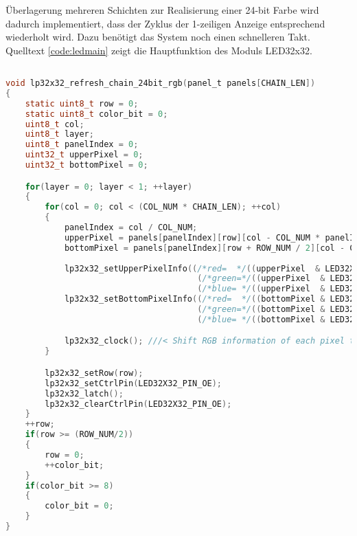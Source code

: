Überlagerung mehreren Schichten zur Realisierung einer 24-bit Farbe wird dadurch implementiert, dass der Zyklus der 1-zeiligen Anzeige entsprechend wiederholt wird. Dazu benötigt das System noch einen schnelleren Takt. Quelltext \ref{code:ledmain} zeigt die Hauptfunktion des Moduls LED32x32.

\begin{lstlisting}[language={c}, caption={Schritte von Panel-Anzeige}, label={code:ledmain}]

void lp32x32_refresh_chain_24bit_rgb(panel_t panels[CHAIN_LEN])
{
    static uint8_t row = 0;
    static uint8_t color_bit = 0;
    uint8_t col;
    uint8_t layer;
    uint8_t panelIndex = 0;
    uint32_t upperPixel = 0;
    uint32_t bottomPixel = 0;

    for(layer = 0; layer < 1; ++layer)
    {
        for(col = 0; col < (COL_NUM * CHAIN_LEN); ++col)
        {
            panelIndex = col / COL_NUM;
            upperPixel = panels[panelIndex][row][col - COL_NUM * panelIndex].particle_count;
            bottomPixel = panels[panelIndex][row + ROW_NUM / 2][col - COL_NUM * panelIndex].particle_count;
            
            lp32x32_setUpperPixelInfo((/*red=  */((upperPixel  & LED32X32_RGB24_R_MASK) >> 16) & (0x01 << color_bit)), 
                                       (/*green=*/((upperPixel  & LED32X32_RGB24_G_MASK) >>  8) & (0x01 << color_bit)),
                                       (/*blue= */((upperPixel  & LED32X32_RGB24_B_MASK)      ) & (0x01 << color_bit)));
            lp32x32_setBottomPixelInfo((/*red=  */((bottomPixel & LED32X32_RGB24_R_MASK) >> 16) & (0x01 << color_bit)), 
                                       (/*green=*/((bottomPixel & LED32X32_RGB24_G_MASK) >>  8) & (0x01 << color_bit)),
                                       (/*blue= */((bottomPixel & LED32X32_RGB24_B_MASK)      ) & (0x01 << color_bit)));

            lp32x32_clock(); ///< Shift RGB information of each pixel to horizontal direction
        }

        lp32x32_setRow(row);
        lp32x32_setCtrlPin(LED32X32_PIN_OE);
        lp32x32_latch();
        lp32x32_clearCtrlPin(LED32X32_PIN_OE);
    }
    ++row;
    if(row >= (ROW_NUM/2))
    {
        row = 0;
        ++color_bit;
    }
    if(color_bit >= 8)
    {
        color_bit = 0;
    }
}
\end{lstlisting}
